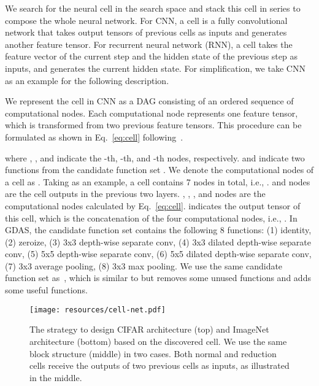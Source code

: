 \documentclass[10pt,twocolumn,letterpaper]{article}
\def\Eqref#1{Eq.~\eqref{#1}}
\begin{document}
We search for the neural cell in the search space and stack this cell in series to compose the whole neural network.
For CNN, a cell is a fully convolutional network that takes output tensors of previous cells as inputs and generates another feature tensor.
For recurrent neural network (RNN), a cell takes the feature vector of the current step and the hidden state of the previous step as inputs, and generates the current hidden state. For simplification, we take CNN as an example for the following description.

We represent the cell in CNN as a DAG  consisting of an ordered sequence of  computational nodes.
Each computational node represents one feature tensor, which is transformed from two previous feature tensors.
This procedure can be formulated as shown in \Eqref{eq:cell} following~\cite{Zoph_2018_CVPR}.

where , , and  indicate the -th, -th, and -th nodes, respectively.  and  indicate two functions from the candidate function set .
We denote the computational nodes of a cell as .
Taking  as an example, a cell contains 7 nodes in total, i.e., .
 and  nodes are the cell outputs in the previous two layers.
, , , and  nodes are the computational nodes calculated by \Eqref{eq:cell}.
 indicates the output tensor of this cell, which is the concatenation of the four computational nodes, i.e., .
In GDAS, the candidate function set  contains the following 8 functions:
(1) identity, (2) zeroize, (3) 3x3 depth-wise separate conv, (4) 3x3 dilated depth-wise separate conv, (5) 5x5 depth-wise separate conv, (6) 5x5 dilated depth-wise separate conv, (7) 3x3 average pooling, (8) 3x3 max pooling.
We use the same candidate function set  as~\cite{liu2019darts}, which is similar to \cite{Zoph_2018_CVPR} but removes some unused functions and adds some useful functions.



\begin{figure}[t!]
\begin{center}
\texttt{[image: resources/cell-net.pdf]}
\end{center}
\caption[Captioning]{
The strategy to design CIFAR architecture (top) and ImageNet architecture (bottom) based on the discovered cell.
We use the same block structure (middle) in two cases.
Both normal and reduction cells receive the outputs of two previous cells as inputs, as illustrated in the middle.
}
\label{fig:cell2net}
\end{figure}
\end{document}

